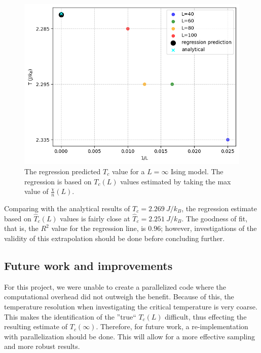 \documentclass[../main_proj4_correct_template.tex]{subfiles}
\begin{document}
\begin{figure}[h!]
    \centering
    \includegraphics[width=0.9\linewidth]{Project 4/figures/p9_predictedTc.png}
    \caption{The regression predicted $T_c$ value for a $L=\infty$ Ising model. The regression is based on $T_c(L)$ values estimated by taking the max value of $\frac{\chi}{n}(L)$.}
    \label{fig:p4regression_predictedTc}
\end{figure}

Comparing with the analytical results of $T_c=2.269~J/k_B$, the regression estimate based on $\hat{T}_c(L)$ values is fairly close at $\hat{T}_c=2.251~J/k_B$. The goodness of fit, that is, the $R^{2}$ value for the regression line, is $0.96$; however, investigations of the validity of this extrapolation should be done before concluding further.

\subsection{Future work and improvements}\label{sec:future_work}

For this project, we were unable to create a parallelized code where the computational overhead did not outweigh the benefit. Because of this, the temperature resolution when investigating the critical temperature is very coarse. This makes the identification of the ''true`` $T_c(L)$ difficult, thus effecting the resulting estimate of $T_c(\infty)$. Therefore, for future work, a re-implementation with parallelization should be done. This will allow for a more effective sampling and more robust results.
\end{document}
